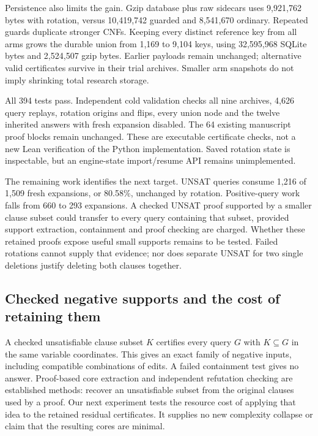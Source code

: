 \documentclass[11pt,a4paper]{article}
\numberwithin{equation}{section}
\theoremstyle{plain}
\theoremstyle{definition}
\theoremstyle{remark}
\begin{document}
Persistence also limits the gain. Gzip database plus raw sidecars uses
9,921,762 bytes with rotation, versus 10,419,742 guarded and 8,541,670 ordinary.
Repeated guards duplicate stronger CNFs. Keeping every distinct reference key
from all arms grows the durable union from 1,169 to 9,104 keys, using 32,595,968
SQLite bytes and 2,524,507 gzip bytes. Earlier payloads remain unchanged;
alternative valid certificates survive in their trial archives. Smaller arm
snapshots do not imply shrinking total research storage.

All 394 tests pass. Independent cold validation checks all nine archives,
4,626 query replays, rotation origins and flips, every union node and the twelve
inherited answers with fresh expansion disabled. The 64 existing manuscript
proof blocks remain unchanged. These are executable certificate checks, not a
new Lean verification of the Python implementation. Saved rotation state is
inspectable, but an engine-state import/resume API remains unimplemented.

The remaining work identifies the next target. UNSAT queries consume 1,216 of
1,509 fresh expansions, or 80.58\%, unchanged by rotation. Positive-query work
falls from 660 to 293 expansions. A checked UNSAT proof supported by a smaller
clause subset could transfer to every query containing that subset, provided
support extraction, containment and proof checking are charged. Whether these
retained proofs expose useful small supports remains to be tested. Failed
rotations cannot supply that evidence; nor does separate UNSAT for two single
deletions justify deleting both clauses together.

\subsection{Checked negative supports and the cost of retaining them}
\label{sec:negative-supports}

A checked unsatisfiable clause subset $K$ certifies every query $G$ with
$K\subseteq G$ in the same variable coordinates. This gives an exact family of
negative inputs, including compatible combinations of edits. A failed
containment test gives no answer. Proof-based core extraction and independent
refutation checking are established methods: \citet{zhang2003checking} recover
an unsatisfiable subset from the original clauses used by a proof. Our next
experiment tests the resource cost of applying that idea to the retained
residual certificates. It supplies no new complexity collapse or claim that
the resulting cores are minimal.
\end{document}
